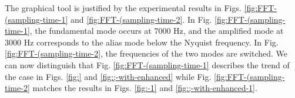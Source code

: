 \documentclass [11pt, proquest] {uwthesis}[2020/02/24]
\begin{document}

The graphical tool is justified by the experimental results in Figs.
\ref{fig:FFT-(sampling-time-1} and \ref{fig:FFT-(sampling-time-2}.
In Fig. \ref{fig:FFT-(sampling-time-1}, the fundamental mode occurs
at $7000$ Hz, and the amplified mode at $3000$ Hz corresponds to
the alias mode below the Nyquist frequency. In Fig. \ref{fig:FFT-(sampling-time-2},
the frequencies of the two modes are switched. We can now distinguish
that Fig. \ref{fig:FFT-(sampling-time-1} describes the trend of the
case in Figs. \ref{fig:} and \ref{fig:;-with-enhanced} while Fig.
\ref{fig:FFT-(sampling-time-2} matches the results in Figs. \ref{fig:-1}
and \ref{fig:;-with-enhanced-1}. 
\end{document}
